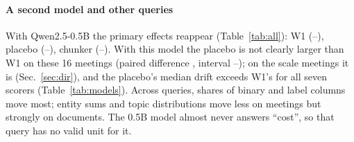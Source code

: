 \documentclass[conference]{IEEEtran}
\begin{document}
\paragraph*{A second model and other queries} With Qwen2.5-0.5B the primary effects reappear (Table~\ref{tab:all}): W1
\nWoneQoneMtwomed{} (\nWoneQoneMtwolo--\nWoneQoneMtwohi), placebo \nWtwoQoneMtwomed{} (\nWtwoQoneMtwolo--\nWtwoQoneMtwohi),
chunker \nWikiQdoneMtwomed{} (\nWikiQdoneMtwolo--\nWikiQdoneMtwohi). With this model the placebo is not clearly larger
than W1 on these 16 meetings (paired difference \nPlaceboGapMtwomed, interval \nPlaceboGapMtwolo--\nPlaceboGapMtwohi);
on the \nScaleN{} scale meetings it is (Sec.~\ref{sec:dir}), and the placebo's median drift exceeds W1's for all seven
scorers (Table~\ref{tab:models}). Across queries, shares of binary and label columns move
most; entity sums and topic distributions move less on meetings but strongly on documents. The 0.5B model almost
never answers ``cost'', so that query has no valid unit for it.
\end{document}

